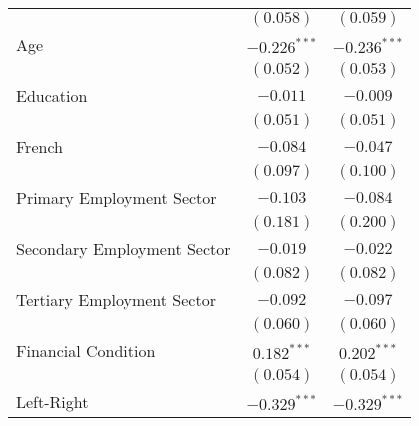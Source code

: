\begin{center}
\begin{tiny}
\begin{longtable}{l@{} c@{} c@{}}
                                                                                           & $(0.058)$        & $(0.059)$      \\
\quad Age                                                                                  & $-0.226^{***}$   & $-0.236^{***}$ \\
                                                                                           & $(0.052)$        & $(0.053)$      \\
\quad Education                                                                            & $-0.011$         & $-0.009$       \\
                                                                                           & $(0.051)$        & $(0.051)$      \\
\quad French                                                                               & $-0.084$         & $-0.047$       \\
                                                                                           & $(0.097)$        & $(0.100)$      \\
\quad Primary Employment Sector                                                            & $-0.103$         & $-0.084$       \\
                                                                                           & $(0.181)$        & $(0.200)$      \\
\quad Secondary Employment Sector                                                          & $-0.019$         & $-0.022$       \\
                                                                                           & $(0.082)$        & $(0.082)$      \\
\quad Tertiary Employment Sector                                                           & $-0.092$         & $-0.097$       \\
                                                                                           & $(0.060)$        & $(0.060)$      \\
\quad Financial Condition                                                                  & $0.182^{***}$    & $0.202^{***}$  \\
                                                                                           & $(0.054)$        & $(0.054)$      \\
\quad Left-Right                                                                           & $-0.329^{***}$   & $-0.329^{***}$ \\

\end{longtable}
\end{tiny}
\end{center}
